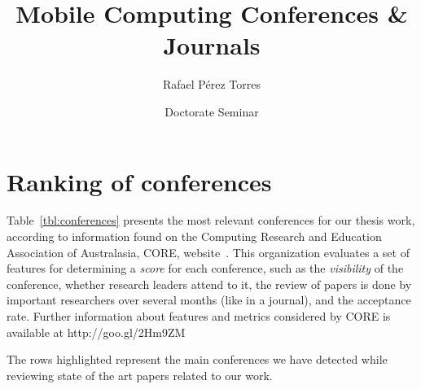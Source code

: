 \documentclass{scrartcl}
\date{Doctorate Seminar}
\begin{document}

\title{Mobile Computing Conferences \& Journals}
\author{Rafael P\'{e}rez Torres}

\maketitle
{}
\section{Ranking of conferences}

Table~\ref{tbl:conferences} presents the most relevant conferences for our thesis work, according to information found on the Computing Research and Education Association of Australasia, CORE, website~\cite{Core2015}.
This organization evaluates a set of features for determining a \emph{score} for each conference, such as the \emph{visibility} of the conference, whether research leaders attend to it, the review of papers is done by important researchers over several months (like in a journal), and the acceptance rate.
Further information about features and metrics considered by CORE is available at http://goo.gl/2Hm9ZM

The rows highlighted represent the main conferences we have detected while reviewing state of the art papers related to our work.
\end{document}
